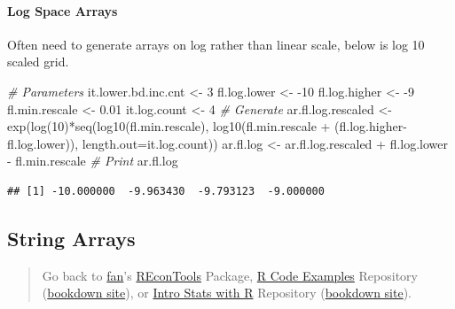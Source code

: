 \documentclass[
]{book}
\newenvironment{Shaded}{\begin{snugshade}}{\end{snugshade}}
\newcommand{\AttributeTok}[1]{\textcolor[rgb]{0.77,0.63,0.00}{#1}}
\newcommand{\CommentTok}[1]{\textcolor[rgb]{0.56,0.35,0.01}{\textit{#1}}}
\newcommand{\DecValTok}[1]{\textcolor[rgb]{0.00,0.00,0.81}{#1}}
\newcommand{\FloatTok}[1]{\textcolor[rgb]{0.00,0.00,0.81}{#1}}
\newcommand{\FunctionTok}[1]{\textcolor[rgb]{0.00,0.00,0.00}{#1}}
\newcommand{\NormalTok}[1]{#1}
\newcommand{\OtherTok}[1]{\textcolor[rgb]{0.56,0.35,0.01}{#1}}
\newcommand{\SpecialCharTok}[1]{\textcolor[rgb]{0.00,0.00,0.00}{#1}}
\begin{document}
\hypertarget{log-space-arrays}{%
\paragraph{Log Space Arrays}\label{log-space-arrays}}

Often need to generate arrays on log rather than linear scale, below is log 10 scaled grid.

\begin{Shaded}
\begin{Highlighting}[]
\CommentTok{\# Parameters}
\NormalTok{it.lower.bd.inc.cnt }\OtherTok{\textless{}{-}} \DecValTok{3}
\NormalTok{fl.log.lower }\OtherTok{\textless{}{-}} \SpecialCharTok{{-}}\DecValTok{10}
\NormalTok{fl.log.higher }\OtherTok{\textless{}{-}} \SpecialCharTok{{-}}\DecValTok{9}
\NormalTok{fl.min.rescale }\OtherTok{\textless{}{-}} \FloatTok{0.01}
\NormalTok{it.log.count }\OtherTok{\textless{}{-}} \DecValTok{4}
\CommentTok{\# Generate}
\NormalTok{ar.fl.log.rescaled }\OtherTok{\textless{}{-}} \FunctionTok{exp}\NormalTok{(}\FunctionTok{log}\NormalTok{(}\DecValTok{10}\NormalTok{)}\SpecialCharTok{*}\FunctionTok{seq}\NormalTok{(}\FunctionTok{log10}\NormalTok{(fl.min.rescale),}
                                      \FunctionTok{log10}\NormalTok{(fl.min.rescale }\SpecialCharTok{+}
\NormalTok{                                              (fl.log.higher}\SpecialCharTok{{-}}\NormalTok{fl.log.lower)),}
                                      \AttributeTok{length.out=}\NormalTok{it.log.count))}
\NormalTok{ar.fl.log }\OtherTok{\textless{}{-}}\NormalTok{ ar.fl.log.rescaled }\SpecialCharTok{+}\NormalTok{ fl.log.lower }\SpecialCharTok{{-}}\NormalTok{ fl.min.rescale}
\CommentTok{\# Print}
\NormalTok{ar.fl.log}
\end{Highlighting}
\end{Shaded}

\begin{verbatim}
## [1] -10.000000  -9.963430  -9.793123  -9.000000
\end{verbatim}

\hypertarget{string-arrays}{%
\subsection{String Arrays}\label{string-arrays}}

\begin{quote}
Go back to \href{http://fanwangecon.github.io/}{fan}'s \href{https://fanwangecon.github.io/REconTools/}{REconTools} Package, \href{https://fanwangecon.github.io/R4Econ/}{R Code Examples} Repository (\href{https://fanwangecon.github.io/R4Econ/bookdown}{bookdown site}), or \href{https://fanwangecon.github.io/Stat4Econ/}{Intro Stats with R} Repository (\href{https://fanwangecon.github.io/Stat4Econ/bookdown}{bookdown site}).
\end{quote}
\end{document}
